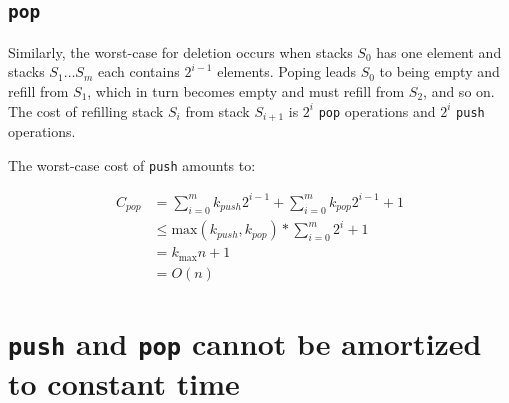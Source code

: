   \subsection{\texttt{pop}}
  Similarly, the worst-case for deletion occurs when stacks $S_0$ has one element and stacks $S_1\ldots S_m$ each contains $2^{i-1}$ elements. Poping leads $S_0$ to being empty and refill from $S_1$, which in turn becomes empty and must refill from $S_2$, and so on. The cost of refilling stack $S_i$ from stack $S_{i+1}$ is $2^i$ \texttt{pop} operations and $2^i$ \texttt{push} operations.

  The worst-case cost of \texttt{push} amounts to:

  \[
  \begin{array}{ll}
    C_{pop} & = \sum_{i=0}^m k_{push} 2^{i-1} + \sum_{i=0}^m k_{pop} 2^{i-1} + 1\\
            & \leq \text{max}(k_{push}, k_{pop}) * \sum_{i=0}^m 2^i + 1\\
            & = k_{\text{max}} n + 1\\
            & = O(n)
  \end{array}
  \]

\section{\texttt{push} and \texttt{pop} cannot be amortized to constant time}
